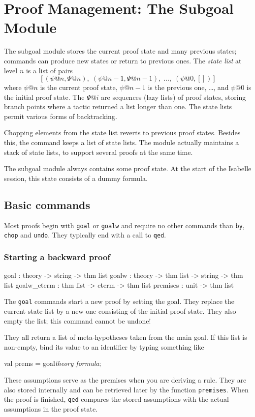 \chapter{Proof Management: The Subgoal Module}

The subgoal module stores the current proof state and
many previous states; commands can produce new states or return to previous
ones.  The {\em state list\/} at level $n$ is a list of pairs
\[ [(\psi@n,\Psi@n),\; (\psi@{n-1},\Psi@{n-1}),\; \ldots,\; (\psi@0,[])] \]
where $\psi@n$ is the current proof state, $\psi@{n-1}$ is the previous
one, \ldots, and $\psi@0$ is the initial proof state.  The $\Psi@i$ are
sequences (lazy lists) of proof states, storing branch points where a
tactic returned a list longer than one.  The state lists permit various
forms of backtracking.

Chopping elements from the state list reverts to previous proof states.
Besides this, the  command keeps a list of state lists.  The
module actually maintains a stack of state lists, to support several
proofs at the same time.

The subgoal module always contains some proof state.  At the start of the
Isabelle session, this state consists of a dummy formula.


\section{Basic commands}
Most proofs begin with \texttt{goal} or \texttt{goalw} and require no other
commands than \texttt{by}, \texttt{chop} and \texttt{undo}.  They typically end
with a call to \texttt{qed}.
\subsection{Starting a backward proof}
\begin{ttbox} 
goal        : theory -> string -> thm list 
goalw       : theory -> thm list -> string -> thm list 
goalw_cterm : thm list -> cterm -> thm list 
premises    : unit -> thm list
\end{ttbox}
The \texttt{goal} commands start a new proof by setting the goal.  They
replace the current state list by a new one consisting of the initial proof
state.  They also empty the  list; this command cannot be
undone!

They all return a list of meta-hypotheses taken from the main goal.  If
this list is non-empty, bind its value to an \ML{} identifier by typing
something like
\begin{ttbox} 
val prems = goal{\it theory\/ formula};
\end{ttbox}
These assumptions serve as the premises when you are deriving a rule.
They are also stored internally and can be retrieved later by the
function \texttt{premises}.  When the proof is finished, \texttt{qed}
compares the stored assumptions with the actual assumptions in the
proof state.

